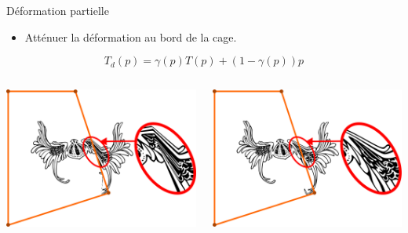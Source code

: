 \documentclass[xcolor=x11names,compress]{beamer}
\renewcommand{\(}{\begin{columns}} \renewcommand{\)}{\end{columns}}
\newcommand{\<}[1]{\begin{column}{#1}} \renewcommand{\>}{\end{column}}
\begin{document}
\begin{frame}{Déformation partielle}
  \begin{itemize}
    \item Atténuer la déformation au bord de la cage.
  \end{itemize}
  \begin{displaymath}
    T_{d}(p) = \gamma(p) T(p) + (1-\gamma(p)) p
  \end{displaymath}
  \begin{columns}[t]
    \begin{column}{0.5\textwidth}
      \centering
      \includegraphics[scale=0.16]{Deformation-Viking-DoubleCage-Sans}
    \end{column}
    \begin{column}{0.5\textwidth}
      \centering
      \includegraphics[scale=0.16]{Deformation-Viking-DoubleCage-Avec}
    \end{column}
  \end{columns}
\end{frame}
\end{document}
